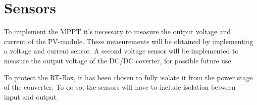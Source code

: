 
\section{Sensors} \label{sensors}
To implement the MPPT it's necessary to measure the output voltage and current of the PV-module. These measurements will be obtained by implementing a voltage and current sensor. A second voltage sensor will be implemented to measure the output voltage of the DC/DC coverter, for possible future use. 

To protect the RT-Box, it has been chosen to fully isolate it from the power stage of the converter. To do so, the sensors will have to include isolation between input and output.  



 
